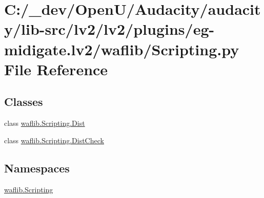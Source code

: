 \hypertarget{lv2_2plugins_2eg-midigate_8lv2_2waflib_2_scripting_8py}{}\section{C\+:/\+\_\+dev/\+Open\+U/\+Audacity/audacity/lib-\/src/lv2/lv2/plugins/eg-\/midigate.lv2/waflib/\+Scripting.py File Reference}
\label{lv2_2plugins_2eg-midigate_8lv2_2waflib_2_scripting_8py}
\subsection*{Classes}
\begin{DoxyCompactItemize}
\item 
class \hyperlink{classwaflib_1_1_scripting_1_1_dist}{waflib.\+Scripting.\+Dist}
\item 
class \hyperlink{classwaflib_1_1_scripting_1_1_dist_check}{waflib.\+Scripting.\+Dist\+Check}
\end{DoxyCompactItemize}
\subsection*{Namespaces}
\begin{DoxyCompactItemize}
\item 
 \hyperlink{namespacewaflib_1_1_scripting}{waflib.\+Scripting}
\end{DoxyCompactItemize}
